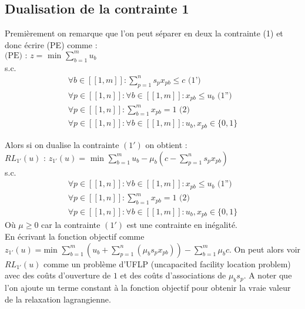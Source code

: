 \documentclass{article}
\begin{document}
\subsection{Dualisation de la contrainte 1}
Premièrement on remarque que l'on peut séparer en deux la contrainte (1) et donc écrire (PE) comme : \\
$\text{(PE) : } z = \text{ min } \sum \limits_{b = 1 }^{m} u_b$\\
s.c.
\begin{align*}
 \forall b \in [\![ 1 , m ]\!] : \sum \limits_{p = 1}^{n} s_p x_{pb} \leqslant c \text{ (1')}\\
 \forall p \in [\![ 1 , n ]\!] : \forall b \in [\![ 1 , m ]\!] : x_{pb} \leqslant u_b \text{ (1'')}\\
 \forall p \in [\![ 1 , n ]\!] : \sum \limits_{b = 1}^{m} x_{pb} = 1 \text{ (2)}\\
 \forall p \in [\![ 1 , n ]\!] : \forall b \in [\![ 1 , m ]\!] : u_b , x_{pb} \in \{0,1\}
\end{align*}

Alors si on dualise la contrainte $(1')$ on obtient :\\
$RL_{1'}(u) \text{ : } z_{1'}(u) = \text{ min } \sum \limits_{b = 1}^{m} u_b - \mu_b (c - \sum \limits_{p = 1}^{n} s_p x_{pb} )$\\
s.c.
\begin{align*}
 \forall p \in [\![ 1 , n ]\!] : \forall b \in [\![ 1 , m ]\!] : x_{pb} \leqslant u_b \text{ (1'')}\\
 \forall p \in [\![ 1 , n ]\!] : \sum \limits_{b = 1}^{m} x_{pb} = 1 \text{ (2)}\\
 \forall p \in [\![ 1 , n ]\!] : \forall b \in [\![ 1 , m ]\!] : u_b , x_{pb} \in \{0,1\}
\end{align*}
Où $\mu \geqslant 0$ car la contrainte $(1')$ est une contrainte en inégalité.\\

En écrivant la fonction objectif comme  $z_{1'}(u) = \text{min } \sum \limits_{b = 1}^{m}( u_b + \sum \limits_{p = 1}^n (\mu_b s_p x_{pb})) - \sum \limits_{b = 1}^{m} \mu_b c$. On peut alors voir $RL_{1'}(u)$ comme un problème d'UFLP (uncapacited facility location problem) avec des coûts d'ouverture de $1$ et des coûts d'associations de $\mu_b s_p$. A noter que l'on ajoute un terme constant à la fonction objectif pour obtenir la vraie valeur de la relaxation lagrangienne.
\end{document}
